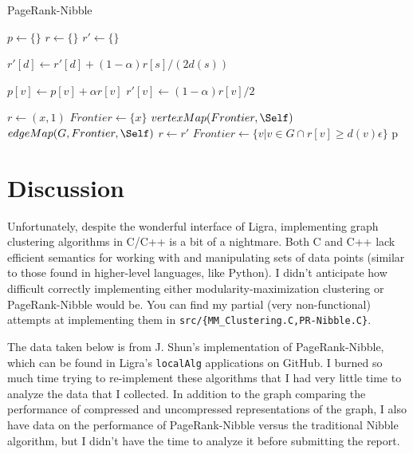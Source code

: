 {\centering
\begin{minipage}{0.9\linewidth}
\begin{algorithm}[H]
	\caption{PageRank-Nibble}



	$p \gets \{\}$\;
	$r \gets \{\}$\;
	$r' \gets \{\}$\;

	{
		$r'[d] \gets r'[d] + (1-\alpha)r[s]/(2d(s))$\;
	}

	{
		$p[v] \gets p[v] + \alpha r[v]$\;
		$r'[v] \gets (1-\alpha)r[v]/2$\;
	}

	{
		$r \gets {(x, 1)}$\;
		$Frontier \gets \{x\}$\;
		{
			$vertexMap(Frontier,\Self)$\;
			$edgeMap(G, Frontier,\Self)$\;
			$r \gets r'$\;
			$Frontier \gets \{v | v \in G \cap r[v] \geq d(v)\epsilon\}$\;
		}
		\Return p\;
	}
\end{algorithm}
\end{minipage}
}

\section{Discussion}

Unfortunately, despite the wonderful interface of Ligra, implementing
graph clustering algorithms in C/C++ is a bit of a nightmare. Both C and
C++ lack efficient semantics for working with and manipulating sets of
data points (similar to those found in higher-level languages, like
Python).  I didn't anticipate how difficult correctly implementing
either modularity-maximization clustering or PageRank-Nibble would be.
You can find my partial (very non-functional) attempts at
implementing them in \texttt{src/\{MM\_Clustering.C,PR-Nibble.C\}}.

The data taken below is from J. Shun's implementation of
PageRank-Nibble, which can be found in Ligra's \texttt{localAlg}
applications on GitHub.  I burned so much time trying to re-implement
these algorithms that I had very little time to analyze the data that I
collected. In addition to the graph comparing the performance of
compressed and uncompressed representations of the graph, I also have
data on the performance of PageRank-Nibble versus the traditional Nibble
algorithm, but I didn't have the time to analyze it before submitting
the report.

